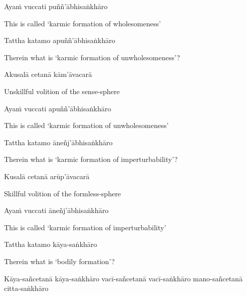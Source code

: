 Ayaṁ vuccati puññ'ābhisaṅkhāro

\begin{english}
  This is called `karmic formation of wholesomeness'
\end{english}

Tattha katamo apuññ'ābhisaṅkhāro

\begin{english-hang}
  Therein what is `karmic formation of unwholesomeness'?
\end{english-hang}

Akusalā cetanā kām'āvacarā

\begin{english}
  Unskillful volition of the sense-sphere
\end{english}

Ayaṁ vuccati apuññ'ābhisaṅkhāro

\begin{english}
  This is called `karmic formation of unwholesomeness'
\end{english}

Tattha katamo āneñj'ābhisaṅkhāro

\begin{english}
  Therein what is `karmic formation of imperturbability'?
\end{english}

Kusalā cetanā arūp'āvacarā

\begin{english}
  Skillful volition of the formless-sphere
\end{english}

Ayaṁ vuccati āneñj'ābhisaṅkhāro

\begin{english}
  This is called `karmic formation of imperturbability'
\end{english}

Tattha katamo kāya-saṅkhāro

\begin{english}
  Therein what is `bodily formation'?
\end{english}

\begin{pali-hang}
  Kāya-sañcetanā kāya-saṅkhāro vacī-sañcetanā vacī-saṅkhāro mano-sañcetanā citta-saṅkhāro\makeatletter\hyperlink{endnote78-appendix}\makeatother
\end{pali-hang}

